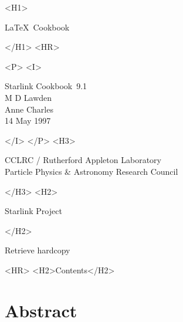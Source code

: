 \documentclass[twoside,11pt]{article}
\newcommand{\stardoccategory}  {Starlink Cookbook}
\newcommand{\stardocsource}    {sc\stardocnumber}
\newcommand{\stardocnumber}    {9.1}
\newcommand{\stardocauthors}   {M D Lawden\\
                                Anne Charles}
\newcommand{\stardocdate}      {14 May 1997}
\newcommand{\stardoctitle}     {\LaTeX\ Cookbook}
\newcommand{\htmladdnormallink}[2]{#1}
\newcommand{\htmladdimg}[1]{}
\newcommand{\htmlref}[2]{#1}
\newcommand{\htmladdtonavigation}[1]{}
\newcommand{\xlabel}[1]{}
\begin{document}
\begin{htmlonly}
   \xlabel{}
   \begin{rawhtml} <H1> \end{rawhtml}
      \stardoctitle
   \begin{rawhtml} </H1> <HR> \end{rawhtml}


   \begin{rawhtml} <P> <I> \end{rawhtml}
   \stardoccategory\ \stardocnumber \\
   \stardocauthors \\
   \stardocdate
   \begin{rawhtml} </I> </P> <H3> \end{rawhtml}
      \htmladdnormallink{CCLRC / Rutherford Appleton Laboratory}
                        {http://www.cclrc.ac.uk} \\
      \htmladdnormallink{Particle Physics \& Astronomy Research Council}
                        {http://www.pparc.ac.uk} \\
   \begin{rawhtml} </H3> <H2> \end{rawhtml}
      \htmladdnormallink{Starlink Project}{http://www.starlink.rl.ac.uk/}
   \begin{rawhtml} </H2> \end{rawhtml}
   \htmladdnormallink{\htmladdimg{source.gif} Retrieve hardcopy}
      {http://www.starlink.rl.ac.uk/cgi-bin/hcserver?\stardocsource}\\

  \label{stardoccontents}
  \begin{rawhtml} 
    <HR>
    <H2>Contents</H2>
  \end{rawhtml}
  \htmladdtonavigation{\htmlref{\htmladdimg{contents_motif.gif}}
        {stardoccontents}}

  \section{\xlabel{abstract}Abstract}

\end{htmlonly}
\end{document}
